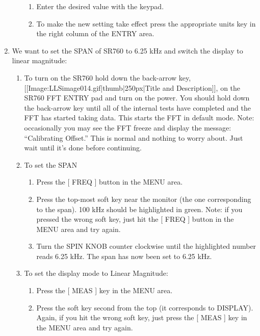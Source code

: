 \documentclass{../lab}
\begin{document}
\begin{enumerate}
\begin{enumerate}
\begin{enumerate}
            \item Enter the desired value with the keypad.

            \item To make the new setting take effect press the appropriate units key in the right column of the ENTRY area.

        \end{enumerate}

    \end{enumerate}

    \item We want to set the SPAN of SR760 to 6.25 kHz and switch the display to linear magnitude:
    \begin{enumerate}
        \item To turn on the SR760 hold down the back-arrow key, [[Image:LLSimage014.gif|thumb|250px|Title and Description]], on the SR760 FFT ENTRY pad and turn on the power. You should hold down the back-arrow key until all of the internal tests have completed and the FFT has started taking data. This starts the FFT in default mode. Note: occasionally you may see the FFT freeze and display the message: ``Calibrating Offset.'' This is normal and nothing to worry about. Just wait until it's done before continuing.

        \item To set the SPAN
        \begin{enumerate}
            \item Press the [ FREQ ] button in the MENU area.

            \item Press the top-most soft key near the monitor (the one corresponding to the span). 100 kHz should be highlighted in green. Note: if you pressed the wrong soft key, just hit the [ FREQ ] button in the MENU area and try again.

            \item Turn the SPIN KNOB counter clockwise until the highlighted number reads 6.25 kHz. The span has now been set to 6.25 kHz.

        \end{enumerate}

        \item To set the display mode to Linear Magnitude:
        \begin{enumerate}
            \item Press the [ MEAS ] key in the MENU area.

            \item Press the soft key second from the top (it corresponds to DISPLAY). Again, if you hit the wrong soft key, just press the [ MEAS ] key in the MENU area and try again.


\end{enumerate}
\end{enumerate}
\end{enumerate}
\end{document}
